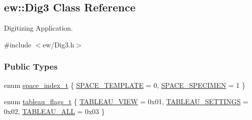 \hypertarget{classew_1_1Dig3}{
\subsection{ew::Dig3 Class Reference}
\label{classew_1_1Dig3}
}


Digitizing Application.  




{\ttfamily \#include $<$ew/Dig3.h$>$}

\subsubsection*{Public Types}
\begin{DoxyCompactItemize}
\item 
enum \hyperlink{classew_1_1Dig3_a218d7ccda5d476de1b2c8970f9c383ee}{space\_\-index\_\-t} \{ \hyperlink{classew_1_1Dig3_a218d7ccda5d476de1b2c8970f9c383eea8c1f651f962feb7eab6c19ee25118422}{SPACE\_\-TEMPLATE} =  0, 
\hyperlink{classew_1_1Dig3_a218d7ccda5d476de1b2c8970f9c383eea6efc6a44da15940b77ef70100ff927cc}{SPACE\_\-SPECIMEN} =  1
 \}
\item 
enum \hyperlink{classew_1_1Dig3_a52d5624e2591670cdb6e7fb212a55c9f}{tableau\_\-flags\_\-t} \{ \hyperlink{classew_1_1Dig3_a52d5624e2591670cdb6e7fb212a55c9fa49d067eb1fe80f6bcb69ff88b9611156}{TABLEAU\_\-VIEW} =  0x01, 
\hyperlink{classew_1_1Dig3_a52d5624e2591670cdb6e7fb212a55c9fac9c4c28672545c31088458b3767c03c7}{TABLEAU\_\-SETTINGS} =  0x02, 
\hyperlink{classew_1_1Dig3_a52d5624e2591670cdb6e7fb212a55c9fa1f77087df3ef36d5e24ec4ca71374d2d}{TABLEAU\_\-ALL} =  0x03
 \}
\end{DoxyCompactItemize}
